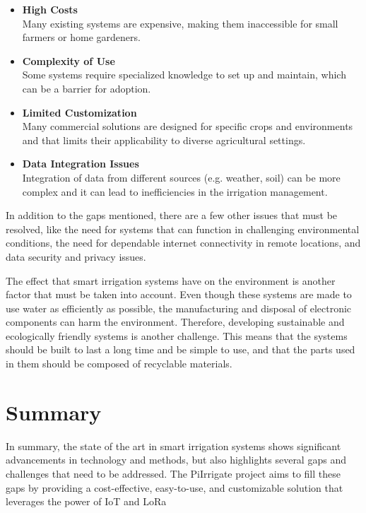 \begin{itemize}
  \item \textbf{High Costs} \\
  Many existing systems are expensive, making them inaccessible for small farmers or home gardeners.
  
  \item \textbf{Complexity of Use} \\
  Some systems require specialized knowledge to set up and maintain, which can be a barrier for adoption.

  \item \textbf{Limited Customization} \\
  Many commercial solutions are designed for specific crops and environments and that limits their
  applicability to diverse agricultural settings.
  \item \textbf{Data Integration Issues} \\
  Integration of data from different sources (e.g. weather, soil) can be more 
  complex and it can lead to inefficiencies in the irrigation management.
\end{itemize}

In addition to the gaps mentioned, there are a few other issues that must be resolved, 
like the need for systems that can function in challenging environmental conditions, 
the need for dependable internet connectivity in remote locations, and data security and privacy issues. 

The effect that smart irrigation systems have on the environment is another factor that must be 
taken into account.
Even though these systems are made to use water as efficiently as possible, the manufacturing 
and disposal of electronic components can harm the environment.
Therefore, developing sustainable and ecologically friendly systems is another challenge. 
This means that the systems should be built to last a long time and be simple to use, 
and that the parts used in them should be composed of recyclable materials.

\section{Summary}
In summary, the state of the art in smart irrigation systems shows significant 
advancements in technology and methods, but also highlights several gaps and challenges 
that need to be addressed. The PiIrrigate project aims to fill these gaps by providing a
cost-effective, easy-to-use, and customizable solution that leverages the power of IoT and LoRa 